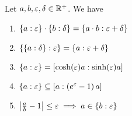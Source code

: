 \begin{theorem} \label{thm:multiplicative:rules}
  Let $a,b,\epsilon,\delta \in\Rplus$. We have

  \begin{enumerate}
    \item $\ean[\epsilon]{a} \cdot \ean[\delta]{b} = \ean[\epsilon+\delta]{a\cdot b}$
    \item $\ean[\epsilon]{\ean[\delta]{a}} = \ean[\epsilon+\delta]{a}$
    \item $\ean[\epsilon]{a} = \an[\sinh(\epsilon)a]{\cosh(\epsilon)a}$
    \item $\ean[\epsilon]{a} \subseteq \an[\left(e^\epsilon-1\right)a]{a}$
    \item $\abs{\frac ab-1} \le \epsilon \implies a\in\ean[\epsilon]{b}$
  \end{enumerate}
\end{theorem}
